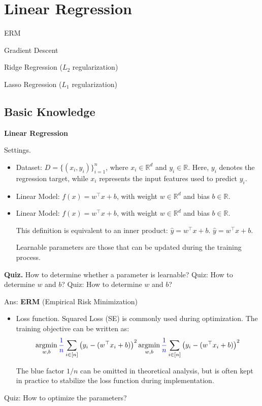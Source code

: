 \documentclass[../main]{subfiles}
\begin{document}
\chapter{Linear Regression}
\begin{introduction}
\item ERM
\item Gradient Descent
\item Ridge Regression ($L_2$ regularization)
\item Lasso Regression ($L_1$ regularization)
\end{introduction}
\section{Basic Knowledge}
\begin{example}
\textbf{Linear Regression}
\end{example}

{Settings.}
\begin{itemize}
  \item Dataset: $D=\{(x_i,y_i)\}_{i=1}^n$, where $x_i\in\mathbb{R}^d$ and $y_i\in\mathbb{R}$.  
  Here, $y_i$ denotes the regression target, while $x_i$ represents the input features used to predict $y_i$.

  \item Linear Model: $f(x)=w^{\top}x+b$, with weight $w\in\mathbb{R}^d$ and bias $b\in\mathbb{R}$.  
  \item Linear Model: $f(x)=w^{\top}x+b$, with weight $w\in\mathbb{R}^d$ and bias $b\in\mathbb{R}$.  
  \begin{note}
    This definition is equivalent to an inner product:  
    $\hat y = w^{\top}x+b.$
    $\hat y = w^{\top}x+b.$
  \end{note}

  \begin{definition}
    Learnable parameters are those that can be updated during the training process.
  \end{definition}
\end{itemize}

\textbf{Quiz.} How to determine whether a parameter is learnable?
Quiz: How to determine $w$ and $b$?
Quiz: How to determine $w$ and $b$?

\noindent Ans: \textbf{ERM} (Empirical Risk Minimization)

\begin{itemize}
  \item Loss function. Squared Loss (SE) is commonly used during optimization. The training objective can be written as:
    \begin{equation}
        \mathop{\mathrm{argmin}}_{w,b}{\color{blue}{\frac{1}{n}}}\sum_{i\in[n]}\left(y_i-(w^\top x_i+b)\right)^2
        \mathop{\mathrm{argmin}}_{w,b}{\color{blue}{\frac{1}{n}}}\sum_{i\in[n]}\left(y_i-(w^\top x_i+b)\right)^2
      \end{equation}
  
  The blue factor $1/n$ can be omitted in theoretical analysis, but is often kept in practice to stabilize the loss function during implementation.
\end{itemize}
Quiz: How to optimize the parameters?
\end{document}
